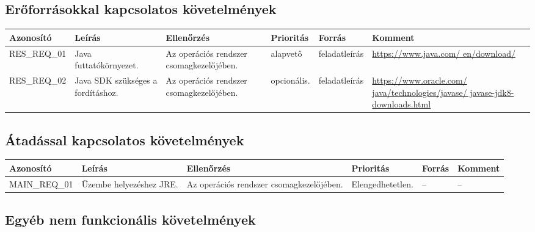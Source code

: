 \subsection{Erőforrásokkal kapcsolatos követelmények}


\begin{longtable}{| l | p{3cm} | p{3cm} | p{3cm} | l | p{3cm} |}
\hline
\textbf{Azonosító}   & \textbf{Leírás} & \textbf{Ellenőrzés} & \textbf{Prioritás} & \textbf{Forrás} & \textbf{Komment} \tabularnewline
\hline\hline
RES\_REQ\_01 & Java futtatókörnyezet. & Az operációs rendszer csomagkezelőjében. & alapvető & feladatleírás & \href{https://www.java.com/en/download/}{ \scriptsize{https://www.java.com/ \newline en/download/}} \tabularnewline
\hline
RES\_REQ\_02 & Java SDK szükséges a fordításhoz. & Az operációs rendszer csomagkezelőjében. & opcionális. & feladatleírás & \href{https://www.oracle.com/java/technologies/javase/javase-jdk8-downloads.html}{ \scriptsize{https://www.oracle.com/ \newline java/technologies/javase/ \newline javase-jdk8-downloads.html}} \tabularnewline
\hline
\end{longtable}


\subsection{Átadással kapcsolatos követelmények}

\begin{longtable}{| l | l | p{3cm} | l | l | l |}
\hline
\textbf{Azonosító}   & \textbf{Leírás} & \textbf{Ellenőrzés} & \textbf{Prioritás} & \textbf{Forrás} & \textbf{Komment} \tabularnewline
\hline\hline
MAIN\_REQ\_01 & Üzembe helyezéshez JRE. & Az operációs rendszer csomagkezelőjében. & Elengedhetetlen. & -- & -- \tabularnewline
\hline
\end{longtable}

\subsection{Egyéb nem funkcionális követelmények}

